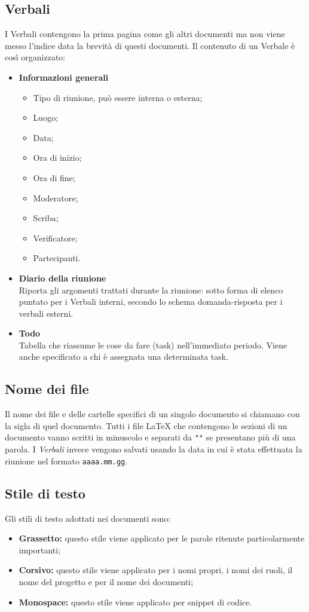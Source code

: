 \subsection{Verbali}
I Verbali contengono la prima pagina come gli altri documenti ma non viene messo l'indice data la brevità di questi documenti. Il contenuto di un Verbale è così organizzato:
\begin{itemize}
    \item \textbf{Informazioni generali}
    \begin{itemize}
        \item Tipo di riunione, può essere interna o esterna;
        \item Luogo;
        \item Data;
        \item Ora di inizio;
        \item Ora di fine;
        \item Moderatore;
        \item Scriba;
        \item Verificatore;
        \item Partecipanti.
    \end{itemize}
    \item \textbf{Diario della riunione}\\
    Riporta gli argomenti trattati durante la riunione: sotto forma di elenco puntato per i Verbali interni, secondo lo schema domanda-risposta per i verbali esterni.
    \item \textbf{Todo}\\
    Tabella che riassume le cose da fare (task) nell'immediato periodo. Viene anche specificato a chi è assegnata una determinata task.
\end{itemize}
\subsection{Nome dei file}
Il nome dei file e delle cartelle specifici di un singolo documento si chiamano con la sigla di quel documento. Tutti i file LaTeX che contengono le sezioni di un documento vanno scritti in minuscolo e separati da \texttt{"\textunderscore"} se presentano più di una parola. I \textit{Verbali} invece vengono salvati usando la data in cui è stata effettuata la riunione nel formato \texttt{aaaa.mm.gg}.
\subsection{Stile di testo}
Gli stili di testo adottati nei documenti sono:
\begin{itemize}
    \item \textbf{Grassetto:} questo stile viene applicato per le parole ritenute particolarmente importanti;
    \item \textbf{Corsivo:} questo stile viene applicato per i nomi propri, i nomi dei ruoli, il nome del progetto e per il nome dei documenti;
    \item \textbf{Monospace:} questo stile viene applicato per snippet di codice.
\end{itemize}

